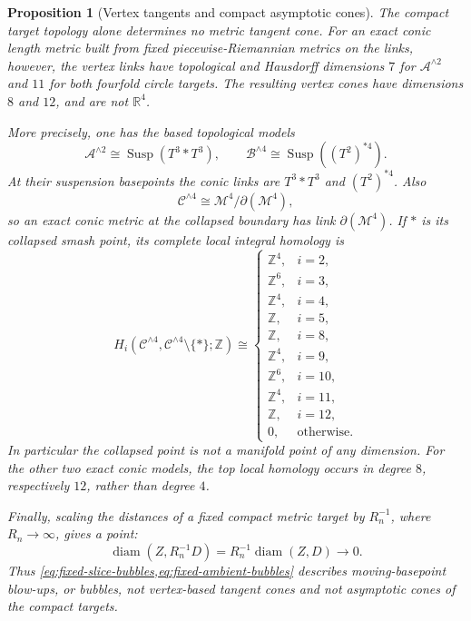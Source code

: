 \documentclass[11pt,letterpaper]{article}
\numberwithin{equation}{section}
\newtheorem{proposition}[theorem]{Proposition}
\theoremstyle{definition}
\theoremstyle{remark}
\newcommand{\R}{\mathbb R}
\newcommand{\Z}{\mathbb Z}
\newcommand{\Susp}{\operatorname{Susp}}
\begin{document}
\begin{proposition}[Vertex tangents and compact asymptotic cones]
\label{prop:tangent-scope}
The compact target topology alone determines no metric tangent cone.  For
an exact conic length metric built from fixed piecewise-Riemannian metrics
on the links, however, the vertex links have topological and Hausdorff
dimensions \(7\) for \(\mathcal A^{\wedge2}\) and \(11\) for both
fourfold circle targets.  The resulting vertex cones have dimensions
\(8\) and \(12\), and are not \(\R^4\).

More precisely, one has the based topological models
\[
 \mathcal A^{\wedge2}\cong\Susp(T^3*T^3),\qquad
 \mathcal B^{\wedge4}\cong\Susp((T^2)^{*4}).
\]
At their suspension basepoints the conic links are \(T^3*T^3\) and
\((T^2)^{*4}\).  Also
\[
 \mathcal C^{\wedge4}\cong\mathcal M^4/\partial(\mathcal M^4),
\]
so an exact conic metric at the collapsed boundary has link
\(\partial(\mathcal M^4)\).  If \(*\) is its collapsed smash point, its
complete local integral homology is
\begin{equation}
 H_i(\mathcal C^{\wedge4},
     \mathcal C^{\wedge4}\setminus\{*\};\Z)
 \cong
 \begin{cases}
  \Z^4,&i=2,\\
  \Z^6,&i=3,\\
  \Z^4,&i=4,\\
  \Z,&i=5,\\
  \Z,&i=8,\\
  \Z^4,&i=9,\\
  \Z^6,&i=10,\\
  \Z^4,&i=11,\\
  \Z,&i=12,\\
  0,&\text{otherwise}.
 \end{cases}
 \label{eq:C-smash-local-homology}
\end{equation}
In particular the collapsed point is not a manifold point of any
dimension.  For the other two exact conic models, the top local homology
occurs in degree \(8\), respectively \(12\), rather than degree \(4\).

Finally, scaling the distances of a fixed compact metric target by
\(R_n^{-1}\), where \(R_n\to\infty\), gives a point:
\[
 \operatorname{diam}(Z,R_n^{-1}D)
 =R_n^{-1}\operatorname{diam}(Z,D)\longrightarrow0.
\]
Thus \cref{eq:fixed-slice-bubbles,eq:fixed-ambient-bubbles} describes
moving-basepoint blow-ups, or bubbles, not vertex-based tangent cones and
not asymptotic cones of the compact targets.
\end{proposition}
\end{document}
